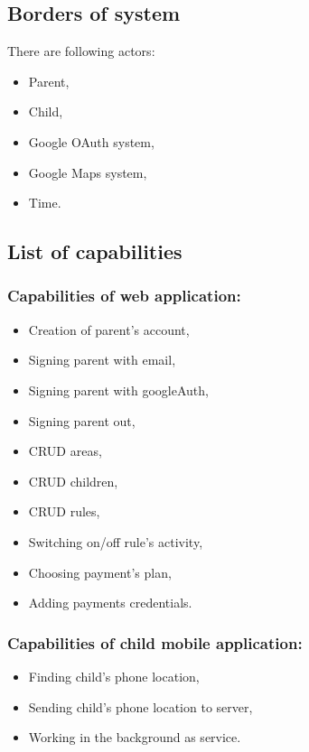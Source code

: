 \documentclass{sprawozdanie-agh}
\begin{document}
		\subsection{Borders of system}

			There are following actors:
			\begin{itemize}
				\item Parent,
				\item Child,
				\item Google OAuth system,
				\item Google Maps system,
				\item Time.
			\end{itemize}

		\subsection{List of capabilities}

			\subsubsection{Capabilities of web application:}

			\begin{itemize}
				\item Creation of parent's account,
				\item Signing parent with email,
				\item Signing parent with googleAuth,
				\item Signing parent out,
				\item CRUD areas,
				\item CRUD children,
				\item CRUD rules,
				\item Switching on/off rule's activity,
				\item Choosing payment's plan,
				\item Adding payments credentials.
			\end{itemize}

			\subsubsection{Capabilities of child mobile application:}

			\begin{itemize}
				\item Finding child's phone location,
				\item Sending child's phone location to server,
				\item Working in the background as service.
			\end{itemize}
\end{document}
